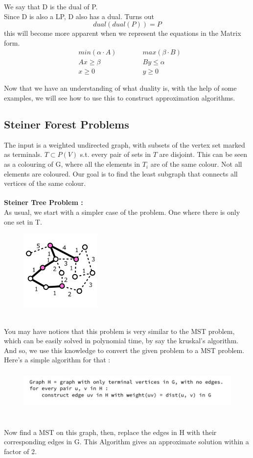 \documentclass[12pt]{report}
\begin{document}
We say that D is the dual of P.\\
Since D is also a LP, D also has a dual. Turns out
\[dual(dual(P)) = P\]
this will become more apparent when we represent the equations in the Matrix form.
\begin{align*}
& min(\alpha \cdot A) \quad \quad \quad &max(\beta \cdot B) \\
& Ax \geq \beta                       & By \leq \alpha \\
& x \geq 0							 & y \geq 0	
\end{align*}

Now that we have an understanding of what duality is, with the help of some examples, we will see how to use this to construct approximation algorithms.
\pagebreak

\subsection*{Steiner Forest Problems} 
The input is a weighted undirected graph, with subsets of the vertex set marked as terminals. $T \subset P(V)$ s.t. every pair of sets in $T$ are disjoint. This can be seen as a colouring of G, where all the elements in $T_i$ are of the same colour. Not all elements are coloured. Our goal is  to find the least subgraph that connects all vertices of the same colour.\\\\
\textbf{Steiner Tree Problem :}\\
As usual, we start with a simpler case of the problem. One where there is only one set in T. 
\begin{figure}[h]
\includegraphics[width=4cm, height=4cm]{steiner_tree.jpg}
\centering
\end{figure}\\
You may have notices that this problem is very similar to the MST problem, which can be easily solved in polynomial time, by say the kruskal's algorithm. And so, we use this knowledge to convert the given problem to a MST problem.\\
Here's a simple algorithm for that :
\begin{figure}[h]
\includegraphics[width=12cm, height=2cm]{stt_algo.jpg}
\centering
\end{figure}\\
Now find a MST on this graph, then, replace the edges in H with their corresponding edges in G. This Algorithm gives an approximate solution within a factor of 2. \\
\end{document}
